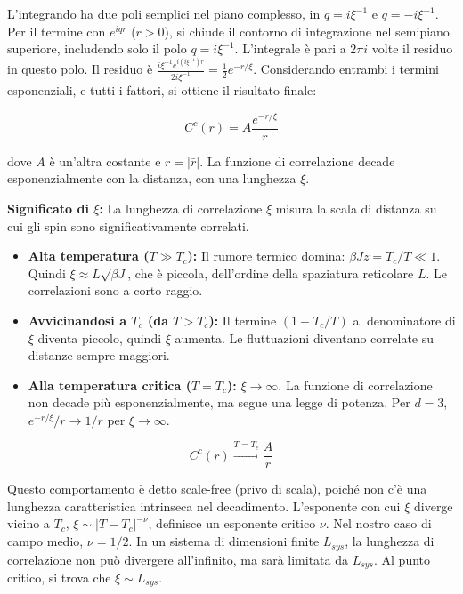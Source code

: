 L'integrando ha due poli semplici nel piano complesso, in $q = i\xi^{-1}$ e $q = -i\xi^{-1}$.
Per il termine con $e^{iqr}$ ($r>0$), si chiude il contorno di integrazione nel semipiano superiore, includendo solo il polo $q = i\xi^{-1}$. L'integrale è pari a $2\pi i$ volte il residuo in questo polo.
Il residuo è $\frac{i\xi^{-1} e^{i(i\xi^{-1})r}}{2i\xi^{-1}} = \frac{1}{2}e^{-r/\xi}$.
Considerando entrambi i termini esponenziali, e tutti i fattori, si ottiene il risultato finale:

\begin{equation} \label{eq:ch19_28}
C^c(r) = A \frac{e^{-r/\xi}}{r}
\end{equation}

dove $A$ è un'altra costante e $r=|\bar{r}|$.
La funzione di correlazione decade esponenzialmente con la distanza, con una lunghezza $\xi$.

\textbf{Significato di $\xi$:}
La lunghezza di correlazione $\xi$ misura la scala di distanza su cui gli spin sono significativamente correlati.
\begin{itemize}
    \item \textbf{Alta temperatura ($T \gg T_c$):} Il rumore termico domina: $\beta J z = T_c/T \ll 1$. Quindi $\xi \approx L\sqrt{\beta J}$, che è piccola, dell'ordine della spaziatura reticolare $L$. Le correlazioni sono a corto raggio.
    \item \textbf{Avvicinandosi a $T_c$ (da $T > T_c$):} Il termine $(1 - T_c/T)$ al denominatore di $\xi$ diventa piccolo, quindi $\xi$ aumenta. Le fluttuazioni diventano correlate su distanze sempre maggiori.
    \item \textbf{Alla temperatura critica ($T = T_c$):} $\xi \rightarrow \infty$. La funzione di correlazione non decade più esponenzialmente, ma segue una legge di potenza. Per $d=3$, $e^{-r/\xi}/r \rightarrow 1/r$ per $\xi \rightarrow \infty$.
\end{itemize}

\begin{equation} \label{eq:ch19_29}
C^c(r) \xrightarrow{T=T_c} \frac{A}{r}
\end{equation}

Questo comportamento è detto scale-free (privo di scala), poiché non c'è una lunghezza caratteristica intrinseca nel decadimento. L'esponente con cui $\xi$ diverge vicino a $T_c$, $\xi \sim |T-T_c|^{-\nu}$, definisce un esponente critico $\nu$. Nel nostro caso di campo medio, $\nu = 1/2$.
In un sistema di dimensioni finite $L_{sys}$, la lunghezza di correlazione non può divergere all'infinito, ma sarà limitata da $L_{sys}$. Al punto critico, si trova che $\xi \sim L_{sys}$.



